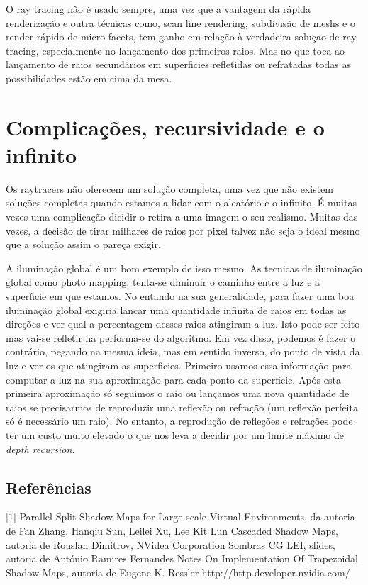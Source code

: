 \documentclass[12pt]{article}
\begin{document}
O ray tracing não é usado sempre, uma vez que a vantagem da rápida renderização e outra técnicas como, scan line rendering, subdivisão de meshs e o render rápido de micro facets, tem ganho em relação à verdadeira soluçao de ray tracing, especialmente no lançamento dos primeiros raios. Mas no que toca ao lançamento de raios secundários em superficies refletidas ou refratadas todas as possibilidades estão em cima da mesa.

\section{Complicações, recursividade e o infinito}
\vspace{10 mm}
\hspace{8 mm}Os raytracers não oferecem um solução completa, uma vez que não existem soluções completas quando estamos a lidar com o aleatório e o infinito. É muitas vezes uma complicação dicidir o retira a uma imagem o seu realismo. Muitas das vezes, a decisão de tirar milhares de raios por pixel talvez não seja o ideal mesmo que a solução assim o pareça exigir.\newline

A iluminação global é um bom exemplo de isso mesmo. As tecnicas de iluminação global como photo mapping, tenta-se diminuir o caminho entre a luz e a superficie em que estamos. No entando na sua generalidade, para fazer uma boa iluminação global exigiria lancar uma quantidade infinita de raios em todas as direções e ver qual a percentagem desses raios atingiram a luz. Isto pode ser feito mas vai-se refletir na performa-se do algoritmo. Em vez disso, podemos é fazer o contrário, pegando na mesma ideia, mas em sentido inverso, do ponto de vista da luz e ver os que atingiram as superficies. Primeiro usamos essa informação para computar a luz na sua aproximação para cada ponto da superficie. Após esta primeira aproximação só seguimos o raio ou lançamos uma nova quantidade de raios se precisarmos de reproduzir uma reflexão ou refração (um reflexão perfeita só é necessário um raio). No entanto, a reprodução de refleções e refrações pode ter um custo muito elevado o que nos leva a decidir por um limite máximo de {\it depth recursion}.

\subsection{Referências}

[1] Parallel-Split Shadow Maps for Large-scale Virtual Environments, da autoria de Fan Zhang, Hanqiu Sun, Leilei Xu, Lee Kit Lun \newline
[2] Cascaded Shadow Maps, autoria de Rouslan Dimitrov, NVidea Corporation \newline
[3] Sombras CG LEI, slides, autoria de António Ramires Fernandes \newline
[4] Notes On Implementation Of Trapezoidal Shadow Maps, autoria de Eugene K. Ressler \newline
[5] http://http.developer.nvidia.com/ \newline
\end{document}
